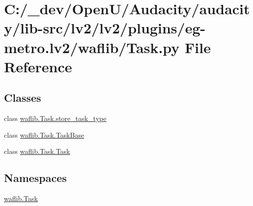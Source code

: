 \hypertarget{lv2_2plugins_2eg-metro_8lv2_2waflib_2_task_8py}{}\section{C\+:/\+\_\+dev/\+Open\+U/\+Audacity/audacity/lib-\/src/lv2/lv2/plugins/eg-\/metro.lv2/waflib/\+Task.py File Reference}
\label{lv2_2plugins_2eg-metro_8lv2_2waflib_2_task_8py}
\subsection*{Classes}
\begin{DoxyCompactItemize}
\item 
class \hyperlink{classwaflib_1_1_task_1_1store__task__type}{waflib.\+Task.\+store\+\_\+task\+\_\+type}
\item 
class \hyperlink{classwaflib_1_1_task_1_1_task_base}{waflib.\+Task.\+Task\+Base}
\item 
class \hyperlink{classwaflib_1_1_task_1_1_task}{waflib.\+Task.\+Task}
\end{DoxyCompactItemize}
\subsection*{Namespaces}
\begin{DoxyCompactItemize}
\item 
 \hyperlink{namespacewaflib_1_1_task}{waflib.\+Task}
\end{DoxyCompactItemize}
